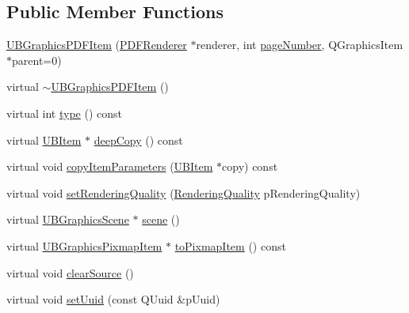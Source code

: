 \subsection*{Public Member Functions}
\begin{DoxyCompactItemize}
\item 
\hyperlink{class_u_b_graphics_p_d_f_item_ae55063d3348b81ea8388df72069713b9}{U\-B\-Graphics\-P\-D\-F\-Item} (\hyperlink{class_p_d_f_renderer}{P\-D\-F\-Renderer} $\ast$renderer, int \hyperlink{class_graphics_p_d_f_item_a7d6a6f4a9eaaea2125bff9244fed220a}{page\-Number}, Q\-Graphics\-Item $\ast$parent=0)
\item 
virtual \hyperlink{class_u_b_graphics_p_d_f_item_a277bf297be6b101feaa042d7acb32e7d}{$\sim$\-U\-B\-Graphics\-P\-D\-F\-Item} ()
\item 
virtual int \hyperlink{class_u_b_graphics_p_d_f_item_a9df7fbaed053442c8430459bbab7b7e6}{type} () const 
\item 
virtual \hyperlink{class_u_b_item}{U\-B\-Item} $\ast$ \hyperlink{class_u_b_graphics_p_d_f_item_a128b9926bef054d7246dfcd356571f36}{deep\-Copy} () const 
\item 
virtual void \hyperlink{class_u_b_graphics_p_d_f_item_ab3d90209627f4a32b21fbdb527bd4468}{copy\-Item\-Parameters} (\hyperlink{class_u_b_item}{U\-B\-Item} $\ast$copy) const 
\item 
virtual void \hyperlink{class_u_b_graphics_p_d_f_item_a61251d03ad330a5b3115221981b94526}{set\-Rendering\-Quality} (\hyperlink{class_u_b_item_a4d073757053cafbe4f26c17ea1224d53}{Rendering\-Quality} p\-Rendering\-Quality)
\item 
virtual \hyperlink{class_u_b_graphics_scene}{U\-B\-Graphics\-Scene} $\ast$ \hyperlink{class_u_b_graphics_p_d_f_item_a1ae5bb3192282698c436e8200fffd33f}{scene} ()
\item 
virtual \hyperlink{class_u_b_graphics_pixmap_item}{U\-B\-Graphics\-Pixmap\-Item} $\ast$ \hyperlink{class_u_b_graphics_p_d_f_item_a53306c58a76534eaea44bb91bab9c49f}{to\-Pixmap\-Item} () const 
\item 
virtual void \hyperlink{class_u_b_graphics_p_d_f_item_aba2b0f76678d2aa7f53a8033a809610a}{clear\-Source} ()
\item 
virtual void \hyperlink{class_u_b_graphics_p_d_f_item_afefe73ee3ba44104aa9ff14126fa74d0}{set\-Uuid} (const Q\-Uuid \&p\-Uuid)
\end{DoxyCompactItemize}
